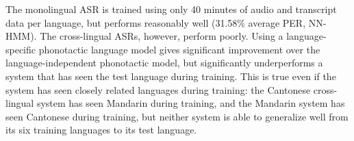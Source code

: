 The monolingual ASR is trained using only 40 minutes of audio and
transcript data per language, but performs reasonably well (31.58\%
average PER, NN-HMM).  The cross-lingual ASRs, however, perform poorly.
Using a language-specific phonotactic language model gives
significant improvement over the language-independent phonotactic
model, but significantly underperforms a system that
has seen the test language during training.  This is true
even if the system has seen closely related languages during training:
the Cantonese cross-lingual system has seen Mandarin during training,
and the Mandarin system has seen Cantonese during training, but
neither system is able to generalize well from its six training languages to
its test language.

